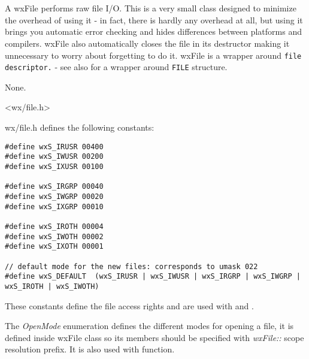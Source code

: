 
\section{}\label{wxfile}

A wxFile performs raw file I/O. This is a very small class designed to
minimize the overhead of using it - in fact, there is hardly any overhead at
all, but using it brings you automatic error checking and hides differences
between platforms and compilers. wxFile also automatically closes the file in
its destructor making it unnecessary to worry about forgetting to do it.
wxFile is a wrapper around {\tt file descriptor.} - see also 
 for a wrapper around {\tt FILE} structure.


None.


<wx/file.h>


wx/file.h defines the following constants:

\begin{verbatim}
#define wxS_IRUSR 00400
#define wxS_IWUSR 00200
#define wxS_IXUSR 00100

#define wxS_IRGRP 00040
#define wxS_IWGRP 00020
#define wxS_IXGRP 00010

#define wxS_IROTH 00004
#define wxS_IWOTH 00002
#define wxS_IXOTH 00001

// default mode for the new files: corresponds to umask 022
#define wxS_DEFAULT  (wxS_IRUSR | wxS_IWUSR | wxS_IRGRP | wxS_IWGRP | wxS_IROTH | wxS_IWOTH)
\end{verbatim}

These constants define the file access rights and are used with 
 and .

The {\it OpenMode} enumeration defines the different modes for opening a file,
it is defined inside wxFile class so its members should be specified with {\it wxFile::} scope
resolution prefix. It is also used with  function.

